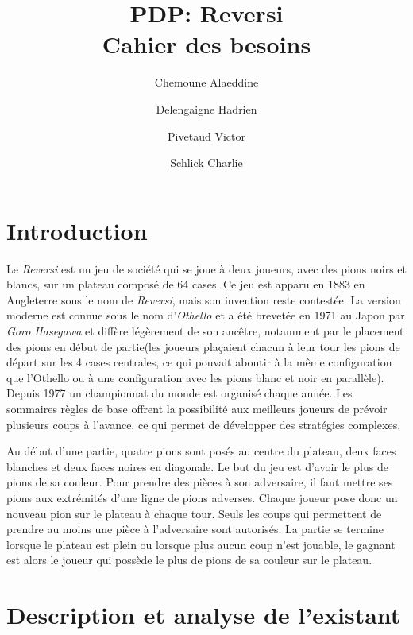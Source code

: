 \documentclass[12pt]{article}
\title{PDP: Reversi\\Cahier des besoins}
\author{
  Chemoune Alaeddine\\ 
  \and
  Delengaigne Hadrien\\
  \and
  Pivetaud Victor\\
  \and
  Schlick Charlie\\
}
\begin{document}
\maketitle

\section{Introduction}
Le \textit{Reversi} est un jeu de société qui se joue à deux joueurs, avec des pions noirs et blancs, sur un plateau composé de 64 cases. Ce jeu est apparu en 1883 en Angleterre sous le nom de \textit{Reversi}, mais son invention reste contestée. La version moderne est connue sous le nom d'\textit{Othello} et a été brevetée en 1971 au Japon par \textit{Goro Hasegawa} et diffère légèrement de son ancêtre, notamment par le placement des pions en début de partie\cite{othello}(les joueurs plaçaient chacun à leur tour les pions de départ sur les 4 cases centrales, ce qui pouvait aboutir à la même configuration que l'Othello ou à une configuration avec les pions blanc et noir en parallèle). Depuis 1977 un championnat du monde est organisé chaque année. Les sommaires règles de base offrent la possibilité aux meilleurs joueurs de prévoir plusieurs coups à l'avance, ce qui permet de développer des stratégies complexes. 

Au début d'une partie, quatre pions sont posés au centre du plateau, deux faces blanches et deux faces noires en diagonale. Le but du jeu est d'avoir le plus de pions de sa couleur. Pour prendre des pièces à son adversaire, il faut mettre ses pions aux extrémités d'une ligne de pions adverses. Chaque joueur pose donc un nouveau pion sur le plateau à chaque tour. Seuls les coups qui permettent de prendre au moins une pièce à l'adversaire sont autorisés. La partie se termine lorsque le plateau est plein ou lorsque plus aucun coup n'est jouable, le gagnant est alors le joueur qui possède le plus de pions de sa couleur sur le plateau.

\section{Description et analyse de l'existant}
\end{document}
